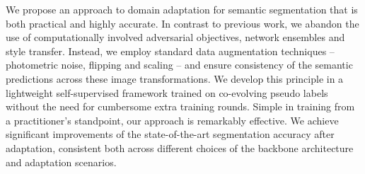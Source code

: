 
We propose an approach to domain adaptation for semantic segmentation that is both practical and highly accurate.
In contrast to previous work, we abandon the use of computationally involved adversarial objectives, network ensembles and style transfer.
Instead, we employ standard data augmentation techniques -- photometric noise, flipping and scaling -- and ensure consistency of the semantic predictions across these image transformations.
We develop this principle in a lightweight self-supervised framework trained on co-evolving pseudo labels without the need for cumbersome extra training rounds.
Simple in training from a practitioner's standpoint, our approach is remarkably effective.
We achieve significant improvements of the state-of-the-art segmentation accuracy after adaptation, consistent both across different choices of the backbone architecture and adaptation scenarios.
%
